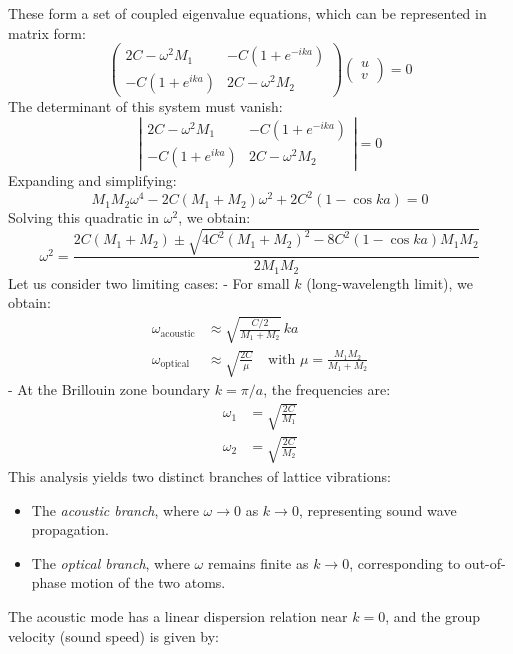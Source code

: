 These form a set of coupled eigenvalue equations, which can be represented in matrix form:
\[
	\begin{pmatrix}
		2C - \omega^2 M_1 & -C(1 + e^{-ika})  \\
		-C(1 + e^{ika})   & 2C - \omega^2 M_2
	\end{pmatrix}
	\begin{pmatrix}
		u \\
		v
	\end{pmatrix}
	= 0
\]
The determinant of this system must vanish:
\[
	\left|
	\begin{matrix}
		2C - \omega^2 M_1 & -C(1 + e^{-ika})  \\
		-C(1 + e^{ika})   & 2C - \omega^2 M_2
	\end{matrix}
	\right| = 0
\]
Expanding and simplifying:
\begin{equation}
	M_1 M_2 \omega^4 - 2C (M_1 + M_2) \omega^2 + 2C^2 (1 - \cos ka) = 0
\end{equation}
Solving this quadratic in \( \omega^2 \), we obtain:
\begin{equation}
	\omega^2 = \frac{2C (M_1 + M_2) \pm \sqrt{4C^2 (M_1 + M_2)^2 - 8C^2 (1 - \cos ka) M_1 M_2}}{2 M_1 M_2}
\end{equation}
Let us consider two limiting cases:
- For small \( k \) (long-wavelength limit), we obtain:
\begin{align}
	\omega_{\text{acoustic}} & \approx \sqrt{\frac{C/2}{M_1 + M_2}} \, ka                                       \\
	\omega_{\text{optical}}  & \approx \sqrt{\frac{2C}{\mu}} \quad \text{with } \mu = \frac{M_1 M_2}{M_1 + M_2}
\end{align}
- At the Brillouin zone boundary \( k = \pi/a \), the frequencies are:
\begin{align}
	\omega_1 & = \sqrt{\frac{2C}{M_1}} \\
	\omega_2 & = \sqrt{\frac{2C}{M_2}}
\end{align}
This analysis yields two distinct branches of lattice vibrations:
\begin{itemize}
	\item The \textit{acoustic branch}, where \( \omega \to 0 \) as \( k \to 0 \), representing sound wave propagation.
	\item The \textit{optical branch}, where \( \omega \) remains finite as \( k \to 0 \), corresponding to out-of-phase motion of the two atoms.
\end{itemize}
The acoustic mode has a linear dispersion relation near \( k = 0 \), and the group velocity (sound speed) is given by:

